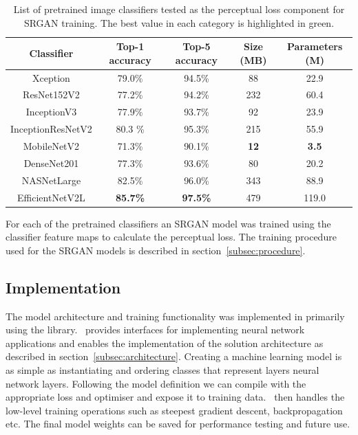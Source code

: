 \begin{table}
    \centering
    \begin{tabular}{ccccc}
        \toprule
        \textbf{Classifier} & \textbf{Top-1 accuracy} & \textbf{Top-5 accuracy} & \textbf{Size (MB)} & \textbf{Parameters (M)} \\
        \midrule
        Xception & 79.0\% & 94.5\% & 88 & 22.9 \\
        ResNet152V2 & 77.2\% & 94.2\% & 232 & 60.4 \\
        InceptionV3 & 77.9\% & 93.7\% & 92 & 23.9 \\
        InceptionResNetV2 & 80.3 \% & 95.3\% & 215 & 55.9 \\
        MobileNetV2 & 71.3\% & 90.1\% & \textbf{12} & \textbf{3.5} \\
        DenseNet201 & 77.3\% & 93.6\% & 80 & 20.2 \\
        NASNetLarge & 82.5\% & 96.0\% & 343 & 88.9 \\
    EfficientNetV2L & \textbf{85.7\%} & \textbf{97.5\%} & 479 & 119.0 \\
        \bottomrule
    \end{tabular}
    \caption{List of pretrained image classifiers tested as the perceptual loss component for SRGAN training. The best value in each category is highlighted in green.}
    \label{table:pretrained_classifiers}
\end{table}

For each of the pretrained classifiers an SRGAN model was trained using the classifier feature maps to calculate the perceptual loss. The training procedure used for the SRGAN models is described in section~\ref{subsec:procedure}.

\subsection{Implementation}
The model architecture and training functionality was implemented in  primarily using the  library.\  provides interfaces for implementing neural network applications and enables the implementation of the solution architecture as described in section~\ref{subsec:architecture}. Creating a machine learning model is as simple as instantiating and ordering  classes that represent layers neural network layers. Following the model definition we can compile with the appropriate loss and optimiser and expose it to training data.\  then handles the low-level training operations such as steepest gradient descent, backpropagation etc. The final model weights can be saved for performance testing and future use.

